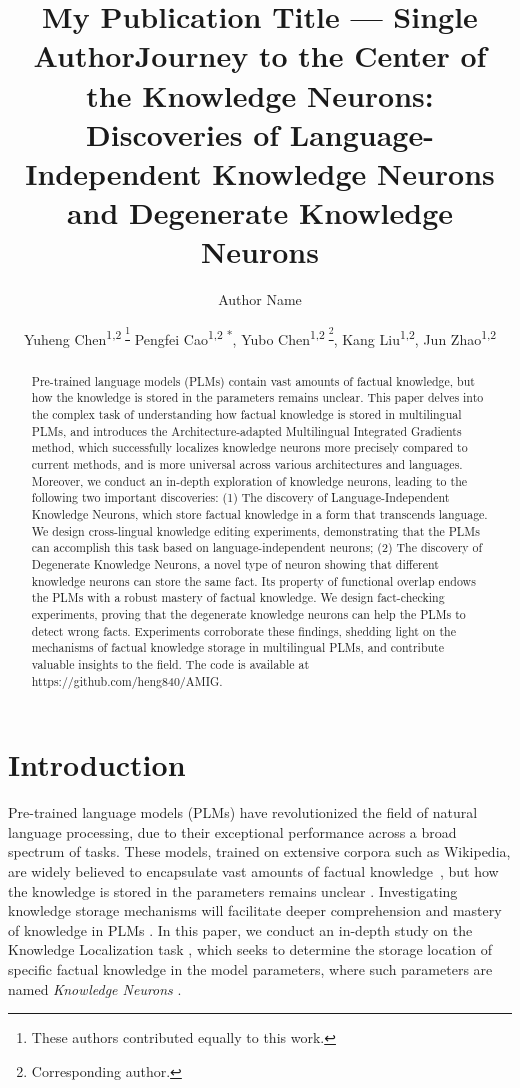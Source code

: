 \documentclass[]{article}
\title{My Publication Title --- Single Author}
\author {
    Author Name
}
\title{Journey to the Center of the Knowledge Neurons: Discoveries of Language-Independent Knowledge Neurons and Degenerate Knowledge Neurons}
\author{
    Yuheng Chen\textsuperscript{\rm 1,\rm 2 \thanks{These authors contributed equally to this work.}}
    Pengfei Cao\textsuperscript{\rm 1,\rm 2 *},
    Yubo Chen\textsuperscript{\rm 1,\rm 2 \thanks{Corresponding author.}},
    Kang Liu\textsuperscript{\rm 1,\rm 2},
    Jun Zhao\textsuperscript{\rm 1,\rm 2}
}
\begin{document}
\maketitle



\begin{abstract}
Pre-trained language models (PLMs) contain vast amounts of factual knowledge, but how the knowledge is stored in the parameters remains unclear. This paper delves into the complex task of understanding how factual knowledge is stored in multilingual PLMs, and introduces the Architecture-adapted Multilingual Integrated Gradients method, which successfully localizes knowledge neurons more precisely compared to current methods, and is more universal across various architectures and languages. Moreover, we conduct an in-depth exploration of knowledge neurons, leading to the following two important discoveries: (1) The discovery of Language-Independent Knowledge Neurons, which store factual knowledge in a form that transcends language. We design cross-lingual knowledge editing experiments, demonstrating that the PLMs can accomplish this task based on language-independent neurons; (2) The discovery of Degenerate Knowledge Neurons, a novel type of neuron showing that different knowledge neurons can store the same fact. Its property of functional overlap endows the PLMs with a robust mastery of factual knowledge. We design fact-checking experiments, proving that the degenerate knowledge neurons can help the PLMs to detect wrong facts. Experiments corroborate these findings, shedding light on the mechanisms of factual knowledge storage in multilingual PLMs, and contribute valuable insights to the field. The code is available at https://github.com/heng840/AMIG.
\end{abstract}


\section{Introduction}
Pre-trained language models (PLMs) \cite{mbert,gpt2,mgpt,openai2023gpt4,touvron2023llama} have revolutionized the field of natural language processing, due to their exceptional performance across a broad spectrum of tasks.
These models, trained on extensive corpora such as Wikipedia, are widely believed to encapsulate vast amounts of factual knowledge~\cite{knowledge-base,knowledge_know_fact}, but how the knowledge is stored in the parameters remains unclear \cite{kandpal2023large}.
Investigating knowledge storage mechanisms will facilitate deeper comprehension and mastery of knowledge in PLMs \cite{zhen2022survey,zhao2023survey}. In this paper, we conduct an in-depth study on the Knowledge Localization task \cite{localization,kl}, which seeks to determine the storage location of specific factual knowledge in the model parameters, where such parameters are named \textit{Knowledge Neurons} \cite{dai2022kn}.
\end{document}
